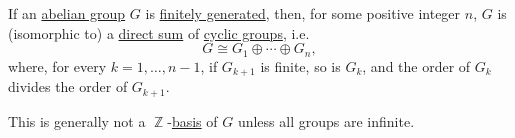 \begin{theorem}\label{thm:fundamental_theorem_of_finitely_generated_abelian_groups}
  If an \hyperref[def:abelian_group]{abelian group} \( G \) is \hyperref[def:semimodule/generated]{finitely generated}, then, for some positive integer \( n \), \( G \) is (isomorphic to) a \hyperref[def:semimodule_direct_sum]{direct sum} of \hyperref[def:cyclic_group]{cyclic groups}, i.e.
  \begin{equation}\label{eq:thm:fundamental_theorem_of_finitely_generated_abelian_groups}
    G \cong G_1 \oplus \cdots \oplus G_n,
  \end{equation}
  where, for every \( k = 1, \ldots, n - 1 \), if \( G_{k+1} \) is finite, so is \( G_k \), and the order of \( G_k \) divides the order of \( G_{k+1} \).
\end{theorem}
\begin{comments}
  \item This is generally not a \( \BbbZ \)-\hyperref[def:hamel_basis]{basis} of \( G \) unless all groups are infinite.
\end{comments}
